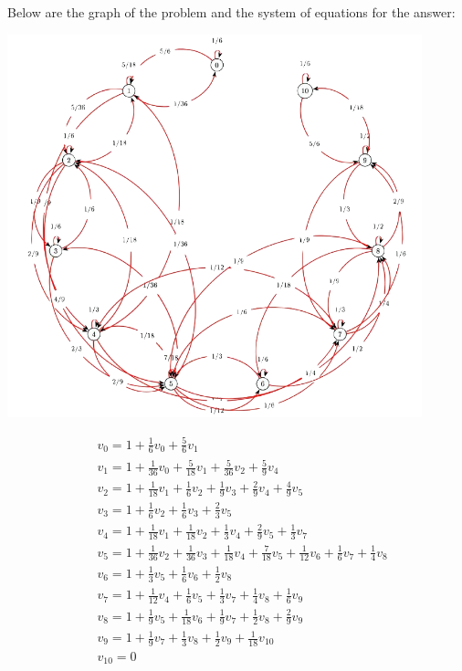 \begin{solution}
Below are the graph of the problem and the system of equations for the answer:

\begin{center}
	\includegraphics[width=12cm]{24/figs/24_diagram2.png}
\end{center}


$$
\begin{aligned}
&v_0 = 1 + \frac{1}{6}v_0 + \frac{5}{6}v_1 \\
&v_1 = 1 + \frac{1}{36}v_0 + \frac{5}{18}v_1 + \frac{5}{36}v_2 + \frac{5}{9}v_4 \\
&v_2 = 1 + \frac{1}{18}v_1 + \frac{1}{6}v_2 + \frac{1}{9}v_3 + \frac{2}{9}v_4 + \frac{4}{ 9}v_5 \\
&v_3 = 1 + \frac{1}{6}v_2 + \frac{1}{6}v_3 + \frac{2}{3}v_5 \\
&v_4 = 1 + \frac{1}{18}v_1 + \frac{1}{18}v_2 + \frac{1}{3}v_4 + \frac{2}{9}v_5 + \frac{1}{ 3}v_7 \\
&v_5 = 1 + \frac{1}{36}v_2 + \frac{1}{36}v_3 + \frac{1}{18}v_4 + \frac{7}{18}v_5 + \frac{1}{ 12}v_6 + \frac{1}{6}v_7 + \frac{1}{4}v_8 \\
&v_6 = 1 + \frac{1}{3}v_5 + \frac{1}{6}v_6 + \frac{1}{2}v_8 \\
&v_7 = 1 + \frac{1}{12}v_4 + \frac{1}{6}v_5 + \frac{1}{3}v_7 + \frac{1}{4}v_8 + \frac{1}{ 6}v_9 \\
&v_8 = 1 + \frac{1}{9}v_5 + \frac{1}{18}v_6 + \frac{1}{9}v_7 + \frac{1}{2}v_8 + \frac{2}{ 9}v_9 \\
&v_9 = 1 + \frac{1}{9}v_7 + \frac{1}{3}v_8 + \frac{1}{2}v_9 + \frac{1}{18}v_{10} \\
&v_{10} = 0
\end{aligned}
$$


\end{solution}
